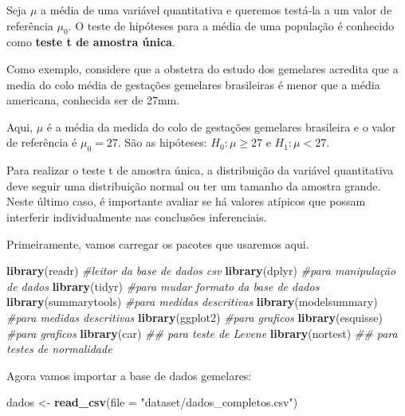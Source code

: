 \documentclass[
]{book}
\newenvironment{Shaded}{\begin{snugshade}}{\end{snugshade}}
\newcommand{\CommentTok}[1]{\textcolor[rgb]{0.56,0.35,0.01}{\textit{#1}}}
\newcommand{\DataTypeTok}[1]{\textcolor[rgb]{0.13,0.29,0.53}{#1}}
\newcommand{\KeywordTok}[1]{\textcolor[rgb]{0.13,0.29,0.53}{\textbf{#1}}}
\newcommand{\NormalTok}[1]{#1}
\newcommand{\StringTok}[1]{\textcolor[rgb]{0.31,0.60,0.02}{#1}}
\begin{document}
Seja \(\mu\) a média de uma variável quantitativa e queremos testá-la a um valor de referência \(\mu_0\). O teste de hipóteses para a média de uma população é conhecido como \textbf{teste t de amostra única}.

Como exemplo, considere que a obstetra do estudo dos gemelares acredita que a media do colo média de gestações gemelares brasileiras é menor que a
média americana, conhecida ser de 27mm.

Aqui, \(\mu\) é a média da medida do colo de gestações gemelares brasileira e o valor de referência é \(\mu_0=27\). São as hipóteses: \(H_0: \mu\geq 27\) e \(H_1: \mu< 27\).

Para realizar o teste t de amostra única, a distribuição da variável quantitativa deve seguir uma distribuição normal ou ter um tamanho da amostra grande. Neste último caso, é importante avaliar se há valores atípicos que possam interferir individualmente nas conclusões inferenciais.

Primeiramente, vamos carregar os pacotes que usaremos aqui.

\begin{Shaded}
\begin{Highlighting}[]
\KeywordTok{library}\NormalTok{(readr) }\CommentTok{#leitor da base de dados csv}
\KeywordTok{library}\NormalTok{(dplyr) }\CommentTok{#para manipulação de dados}
\KeywordTok{library}\NormalTok{(tidyr) }\CommentTok{#para mudar formato da base de dados}
\KeywordTok{library}\NormalTok{(summarytools) }\CommentTok{#para medidas descritivas}
\KeywordTok{library}\NormalTok{(modelsummary) }\CommentTok{#para medidas descritivas}
\KeywordTok{library}\NormalTok{(ggplot2) }\CommentTok{#para graficos}
\KeywordTok{library}\NormalTok{(esquisse) }\CommentTok{#para graficos}
\KeywordTok{library}\NormalTok{(car) }\CommentTok{## para teste de Levene}
\KeywordTok{library}\NormalTok{(nortest) }\CommentTok{## para testes de normalidade}
\end{Highlighting}
\end{Shaded}

Agora vamos importar a base de dados gemelares:

\begin{Shaded}
\begin{Highlighting}[]
\NormalTok{dados <-}\StringTok{ }\KeywordTok{read_csv}\NormalTok{(}\DataTypeTok{file =} \StringTok{"dataset/dados_completos.csv"}\NormalTok{)}
\end{Highlighting}
\end{Shaded}
\end{document}

